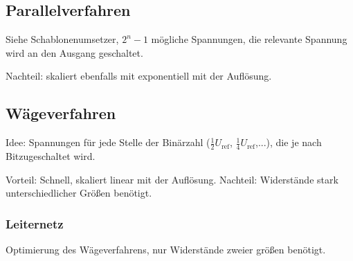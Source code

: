 \subsection{Parallelverfahren}
Siehe Schablonenumsetzer, $2^n -1$ mögliche Spannungen, die relevante Spannung wird an den Ausgang geschaltet.

Nachteil: skaliert ebenfalls mit exponentiell mit der Auflösung.

\subsection{Wägeverfahren}
Idee: Spannungen für jede Stelle der Binärzahl ($\frac{1}{2} U_\text{ref}$, $\frac{1}{4} U_\text{ref}$,...), die je nach Bitzugeschaltet wird.

Vorteil: Schnell, skaliert linear mit der Auflösung. Nachteil: Widerstände stark unterschiedlicher Größen benötigt.

\subsubsection{Leiternetz}
Optimierung des Wägeverfahrens, nur Widerstände zweier größen benötigt.
